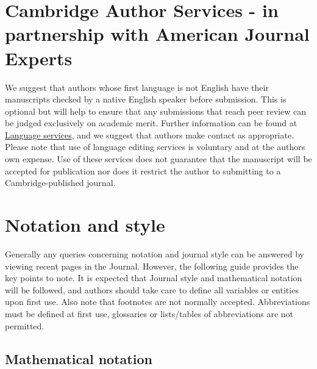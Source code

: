 \documentclass[lineno]{jfm}
\begin{document}
\section{Cambridge Author Services - in partnership with American Journal Experts}
 We suggest that authors whose first language is not English have their manuscripts checked by a native English speaker before submission. This is optional but will help to ensure that any submissions that reach peer review can be judged exclusively on academic merit. Further information can be found at \href{https://www.cambridge.org/core/services/authors/language-services} {Language services}, and we suggest that authors make contact as appropriate. Please note that use of language editing services is voluntary and at the author\textquotesingle s own expense. Use of these services does not guarantee that the manuscript will be accepted for publication nor does it restrict the author to submitting to a Cambridge-published journal.

\section{Notation and style}\label{notstyle}
 Generally any queries concerning notation and journal style can be answered by viewing recent pages in the Journal. However, the following guide provides the key points to note. It is expected that Journal style and mathematical notation will be followed, and authors should take care to define all variables or entities upon first use. Also note that footnotes are not normally accepted.  Abbreviations must be defined at first use, glossaries or lists/tables of abbreviations are not permitted.

\subsection{Mathematical notation}
\end{document}
